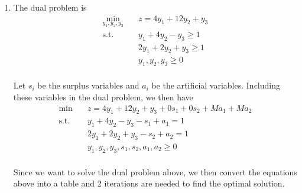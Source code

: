 \documentclass[a4paper,10pt]{article}
\begin{document}
\begin{enumerate}
\begin{enumerate}
{\begin{enumerate}
                The values of the slack variables are
                \[
                    \omega_1 = 0, \omega_2 = 0, \omega_3 = 3 
                \]
    
                The values of the decision variables are 
                \[
                    x_1 = \frac{8}{3} \\ x_2 = \frac{2}{3}
                \]

                The objective value
                \[
                    z = x_1 + x_2 = \frac{10}{3}
                \]

            \item The dual problem is
                \begin{equation}
                    \begin{aligned}
                        \min_{y_1, y_2, y_3} \quad & z = 4y_1 + 12y_2 + y_3 \\
                        \textrm{s.t.}   \quad & y_1 + 4y_2 - y_3 \geq 1 \\
                                        \quad & 2y_1 + 2y_2 + y_3 \geq 1 \\
                                        \quad & y_1, y_2, y_3 \geq 0 \\
                    \end{aligned}
                \end{equation}

                Let $s_i$ be the surplus variables and $a_i$ be the artificial variables. Including these variables in the dual problem, we then have
                \begin{equation}
                    \begin{aligned}
                        \min \quad & z = 4y_1 + 12y_2 + y_3 + 0s_1 + 0s_2 + Ma_1 + Ma_2 \\
                        \textrm{s.t.}   \quad & y_1 + 4y_2 - y_3 - s_1 + a_1 =  1 \\
                                        \quad & 2y_1 + 2y_2 + y_3 - s_2 + a_2 = 1 \\
                                        \quad & y_1, y_2, y_3, s_1, s_2, a_1, a_2 \geq 0 \\
                    \end{aligned}
                \end{equation}

                Since we want to solve the dual problem above, we then convert the equations above into a table and 2 iterations are needed to find the optimal solution.


\end{enumerate}}
\end{enumerate}
\end{enumerate}
\end{document}
